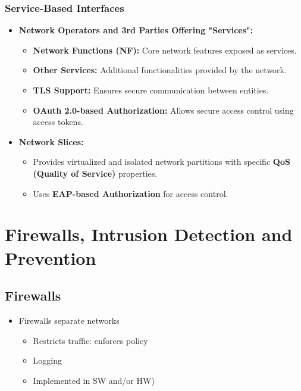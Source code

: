 \subsubsection{Service-Based Interfaces}
\begin{itemize}
    \item \textbf{Network Operators and 3rd Parties Offering "Services":}
    \begin{itemize}
        \item \textbf{Network Functions (NF):} Core network features exposed as services.
        \item \textbf{Other Services:} Additional functionalities provided by the network.
        \item \textbf{TLS Support:} Ensures secure communication between entities.
        \item \textbf{OAuth 2.0-based Authorization:} Allows secure access control using access tokens.
    \end{itemize}

    \item \textbf{Network Slices:}
    \begin{itemize}
        \item Provides virtualized and isolated network partitions with specific \textbf{QoS (Quality of Service)} properties.
        \item Uses \textbf{EAP-based Authorization} for access control.
    \end{itemize}
\end{itemize}

\section{Firewalls, Intrusion Detection and Prevention}
\subsection{Firewalls}
\begin{itemize}
  \item Firewalls separate networks
    \begin{itemize}
      \item Restricts traffic: enforces policy
      \item Logging
      \item Implemented in SW and/or HW)
    \end{itemize}
\end{itemize}

